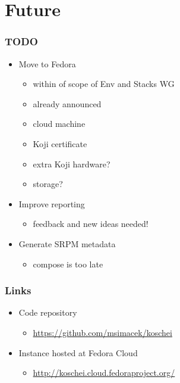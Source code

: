 \documentclass[pdftex,unicode,xcolor=table]{beamer}
\begin{document}
\section{Future}
\begin{frame}
  \frametitle{TODO}
  \begin{itemize}
    \item Move to Fedora
    \begin{itemize}
      \item within of scope of Env and Stacks WG
      \item already announced
      \item cloud machine
      \item Koji certificate
      \item extra Koji hardware?
      \item storage?
    \end{itemize}
    \item Improve reporting
    \begin{itemize}
      \item feedback and new ideas needed!
    \end{itemize}
    \item Generate SRPM metadata
    \begin{itemize}
      \item compose is too late
    \end{itemize}
  \end{itemize}
\end{frame}

\begin{frame}
  \frametitle{Links}
  \begin{itemize}
    \item Code repository
    \begin{itemize}
      \item \url{https://github.com/msimacek/koschei}
    \end{itemize}
    \item Instance hosted at Fedora Cloud
    \begin{itemize}
      \item \url{http://koschei.cloud.fedoraproject.org/}
    \end{itemize}
  \end{itemize}
\end{frame}


 {
  \Rhbg{\frame{\theend}}
}
\end{document}
